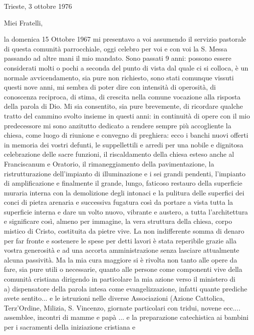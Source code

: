 \begin{flushright}
Trieste, 3 ottobre 1976
\end{flushright}
Miei Fratelli,\par
\noindent la domenica 15 Ottobre 1967 mi presentavo a voi assumendo il servizio pastorale di questa comunità parrocchiale, oggi celebro per voi e con voi la S. Messa passando ad altre mani il mio mandato.
Sono passati 9 anni: possono essere considerati molti o pochi a seconda del punto di vista dal quale ci si colloca, è un normale avvicendamento, sia pure non richiesto, sono stati comunque vissuti 
questi nove anni, mi sembra di poter dire con intensità di operosità, di conoscenza reciproca, di stima, di crescita nella comune vocazione alla risposta della parola di Dio.
Mi sia consentito, sia pure brevemente, di ricordare qualche tratto del cammino svolto insieme in questi anni:
in continuità di opere con il mio predecessore mi sono anzitutto dedicato a rendere sempre più accogliente la chiesa, come luogo di riunione e convegno di preghiera: 
ecco i banchi nuovi offerti in memoria dei vostri defunti, le suppellettili e arredi per una nobile e dignitosa celebrazione delle sacre funzioni, il riscaldamento della chiesa esteso anche al 
Franciscanum e Oratorio, il rimaneggiamento della pavimentazione, la ristrutturazione dell’impianto di illuminazione e i sei grandi pendenti, l’impianto di amplificazione e finalmente
il grande, lungo, faticoso restauro della superficie muraria interna con la demolizione degli intonaci e la pulitura delle superfici dei conci di pietra arenaria e successiva fugatura così
da portare a vista tutta la superficie interna e dare un volto nuovo, vibrante e austero, a tutta l'architettura e significare così, almeno per immagine, la vera struttura della chiesa, corpo
mistico di Cristo, costituita da pietre vive.
La non indifferente somma di denaro per far fronte e sostenere le spese per detti lavori è stata reperibile grazie alla vostra generosità e ad una accorta amministrazione senza lasciare
attualmente alcuna passività.
Ma la mia cura maggiore si è rivolta non tanto alle opere da fare, sia pure utili o necessarie, quanto alle persone come componenti vive della comunità cristiana dirigendo in particolare 
la mia azione verso il ministero di\\
a) dispensatore della parola intesa come evangelizzazione, infatti quante prediche avete sentito... e le istruzioni nelle diverse Associazioni (Azione Cattolica, Terz'Ordine, Milizia, 
S. Vincenzo, giornate particolari con tridui, novene ecc.... assemblee, incontri di mamme e papà ... e la preparazione catechistica ai bambini per i sacramenti della iniziazione cristiana e 
